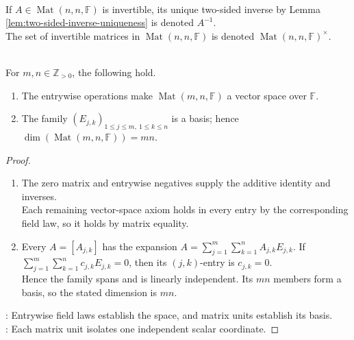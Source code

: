 \begin{definition} \\
If $A\in\operatorname{Mat}(n,n,\mathbb{F})$ is invertible, its unique two-sided inverse by Lemma \ref{lem:two-sided-inverse-uniqueness} is denoted $A^{-1}$.\\
The set of invertible matrices in $\operatorname{Mat}(n,n,\mathbb{F})$ is denoted $\operatorname{Mat}(n,n,\mathbb{F})^{\times}$.
\end{definition}

\begin{proposition} \label{prop:matrix-spaces-are-vector-spaces} \\
For $m,n\in\mathbb{Z}_{>0}$, the following hold.
\begin{enumerate}[label=(\roman*)]
\setlength{\itemsep}{0pt}
\item The entrywise operations make $\operatorname{Mat}(m,n,\mathbb{F})$ a vector space over $\mathbb{F}$.
\item The family $(E_{j,k})_{1\leq j\leq m,\ 1\leq k\leq n}$ is a basis; hence $\dim(\operatorname{Mat}(m,n,\mathbb{F}))=mn$.
\end{enumerate}
\begin{proof}
\begin{enumerate}[label=(\roman*)]
\setlength{\itemsep}{0pt}
\item The zero matrix and entrywise negatives supply the additive identity and inverses.\\
Each remaining vector-space axiom holds in every entry by the corresponding field law, so it holds by matrix equality.
\item Every $A=[A_{j,k}]$ has the expansion $A=\sum\limits_{j=1}^{m}\sum\limits_{k=1}^{n}A_{j,k}E_{j,k}$. If $\sum\limits_{j=1}^{m}\sum\limits_{k=1}^{n}c_{j,k}E_{j,k}=0$, then its $(j,k)$-entry is $c_{j,k}=0$.\\
Hence the family spans and is linearly independent. Its $mn$ members form a basis, so the stated dimension is $mn$.
\end{enumerate}
: Entrywise field laws establish the space, and matrix units establish its basis.\\
: Each matrix unit isolates one independent scalar coordinate.
\end{proof}
\end{proposition}

